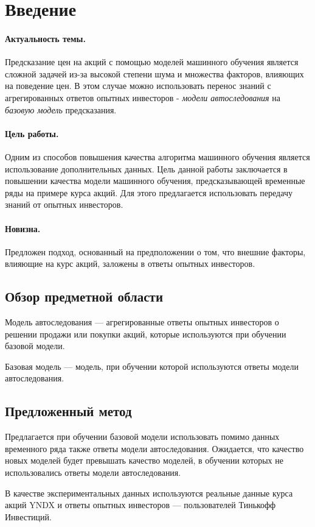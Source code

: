 \newpage

\section{Введение}

\paragraph{Актуальность темы.} 
Предсказание цен на акций с помощью моделей машинного обучения является сложной задачей из-за высокой степени шума и множества факторов, влияющих на поведение цен.
В этом случае можно использовать перенос знаний с агрегированных ответов опытных инвесторов - \textit{модели автоследования} на \textit{базовую модель} предсказания.

\paragraph{Цель работы.} Одним из способов повышения качества алгоритма машинного обучения является использование дополнительных данных. Цель данной работы заключается
в повышении качества модели машинного обучения, предсказывающей временные ряды на примере курса акций. Для этого предлагается использовать передачу знаний от опытных инвесторов.

\paragraph{Новизна.}
Предложен подход, основанный на предположении о том, что внешние факторы, влияющие на курс акций, заложены в ответы опытных инвесторов.

\subsection{Обзор предметной области}

\begin{definition}
Модель автоследования --- агрегированные ответы опытных инвесторов о решении продажи или покупки акций, которые используются при обучении базовой модели.
\end{definition}

\begin{definition}
Базовая модель --- модель, при обучении которой используются ответы модели автоследования.
\end{definition}

\subsection{Предложенный метод}

Предлагается при обучении базовой модели использовать помимо данных временного ряда также ответы модели автоследования. Ожидается, что качество новых моделей будет превышать качество моделей, в обучении которых не использовались ответы модели автоследования.

В качестве экспериментальных данных используются реальные данные курса акций YNDX и ответы опытных инвесторов --- пользователей Тинькофф Инвестиций.